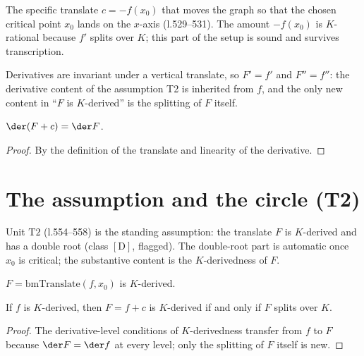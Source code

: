 \begin{definition}\label{bmTranslate}\leanok
{}
The specific translate $c=-f(x_{0})$ that moves the graph so that the chosen critical
point $x_{0}$ lands on the $x$-axis (l.529--531).  The amount $-f(x_{0})$ is
$K$-rational because $f'$ splits over $K$; this part of the setup is sound and survives
transcription.
\end{definition}

Derivatives are invariant under a vertical translate, so $F'=f'$ and $F''=f''$: the
derivative content of the assumption T2 is inherited from $f$, and the only new content
in ``$F$ is $K$-derived'' is the splitting of $F$ itself.

\begin{lemma}\label{derivative_translate}\leanok
{}
$\der(F+c)=\der F$.
\end{lemma}
\begin{proof}\leanok
By the definition of the translate and linearity of the derivative.
\end{proof}

\section{The assumption and the circle (T2)}

Unit $\mathrm{T2}$ (l.554--558) is the standing assumption: the translate $F$ is
$K$-derived and has a double root (class $[\mathrm{D}]$, flagged).  The double-root part
is automatic once $x_{0}$ is critical; the substantive content is the $K$-derivedness of
$F$.

\begin{definition}\label{T2_assumption}\leanok
{}
$F=\mathrm{bmTranslate}(f,x_{0})$ is $K$-derived.
\end{definition}

\begin{lemma}\label{KDerived_translate_iff}\leanok
{}
If $f$ is $K$-derived, then $F=f+c$ is $K$-derived if and only if $F$ splits over $K$.
\end{lemma}
\begin{proof}\leanok
{}
The derivative-level conditions of $K$-derivedness transfer from $f$ to $F$ because
$\der F=\der f$ at every level; only the splitting of $F$ itself is new.
\end{proof}

